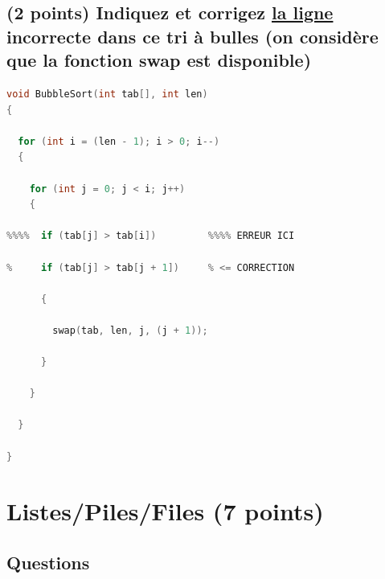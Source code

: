 \documentclass[11pt,a4paper]{article}
\begin{document}
\subsection{(2 points) Indiquez et corrigez \underline{la ligne} incorrecte dans ce tri à bulles (on considère que la fonction \og swap \fg{} est disponible) }

\bigskip



\begin{lstlisting}[language=C,commentstyle=\color{commentgreen}]
void BubbleSort(int tab[], int len)
{

  for (int i = (len - 1); i > 0; i--)
  {

    for (int j = 0; j < i; j++)
    {

%%%%  if (tab[j] > tab[i])         %%%% ERREUR ICI

%     if (tab[j] > tab[j + 1])     % <= CORRECTION

      {

        swap(tab, len, j, (j + 1));

      }

    }

  }

}
\end{lstlisting}


\clearpage


\section{Listes/Piles/Files (7 points)}

\subsection*{Questions}

\end{document}
